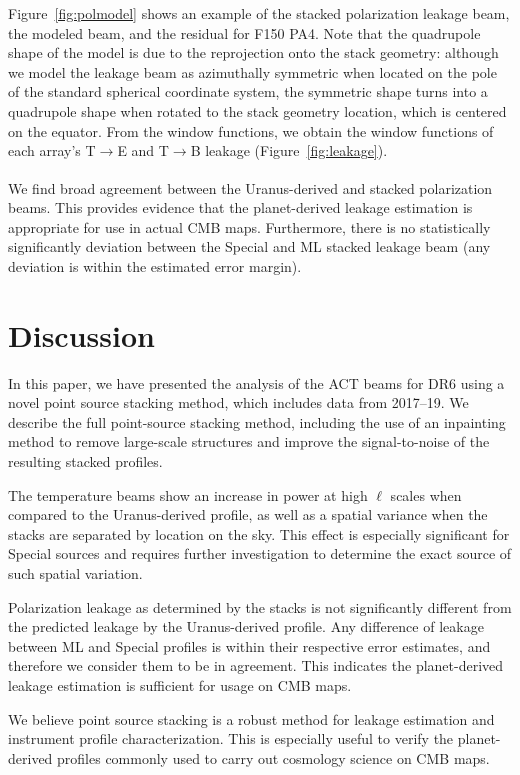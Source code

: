 Figure~\ref{fig:polmodel} shows an example of the stacked polarization leakage beam, the modeled beam, and the residual for F150 PA4. Note that the quadrupole shape of the model is due to the reprojection onto the stack geometry: although we model the leakage beam as azimuthally symmetric when located on the pole of the standard spherical coordinate system, the symmetric shape turns into a quadrupole shape when rotated to the stack geometry location, which is centered on the equator. From the window functions, we obtain the window functions of each array's T$\xrightarrow[]{}$E and T$\xrightarrow[]{}$B leakage (Figure~\ref{fig:leakage}).

We find broad agreement between the Uranus-derived and stacked polarization beams.  This provides evidence that the planet-derived leakage estimation is appropriate for use in actual CMB maps.  Furthermore, there is no statistically significantly deviation between the Special and ML stacked leakage beam (any deviation is within the estimated error margin).

\section{Discussion}
\label{sec:act_disc}
In this paper, we have presented the analysis of the ACT beams for DR6 using a novel point source stacking method, which includes data from 2017--19.  We describe the full point-source stacking method, including the use of an inpainting method to remove large-scale structures and improve the signal-to-noise of the resulting stacked profiles.

The temperature beams show an increase in power at high $\ell$ scales when compared to the Uranus-derived profile, as well as a spatial variance when the stacks are separated by location on the sky.  This effect is especially significant for Special sources and requires further investigation to determine the exact source of such spatial variation.

Polarization leakage as determined by the stacks is not significantly different from the predicted leakage by the Uranus-derived profile.  Any difference of leakage between ML and Special profiles is within their respective error estimates, and therefore we consider them to be in agreement.  This indicates the planet-derived leakage estimation is sufficient for usage on CMB maps.

We believe point source stacking is a robust method for leakage estimation and instrument profile characterization.  This is especially useful to verify the planet-derived profiles commonly used to carry out cosmology science on CMB maps.
